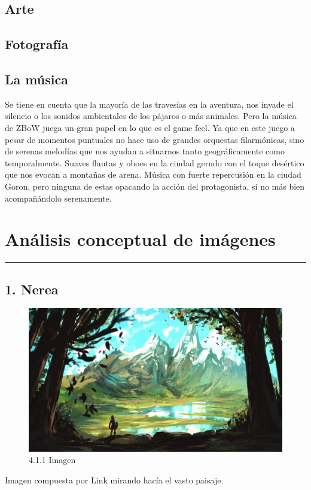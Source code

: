 \documentclass[12pt]{article}
\begin{document}
\subsection{Arte}

\subsection{Fotografía}

\subsection{La música}
Se tiene en cuenta que la mayoría de las travesías en la aventura, nos invade el silencio o los sonidos ambientales de los pájaros o más animales. Pero la música de ZBoW juega un gran papel en lo que es el game feel. Ya que en este juego a pesar de momentos puntuales no hace uso de grandes orquestas filarmónicas, sino de serenas melodías que nos ayudan a situarnos tanto geográficamente como temporalmente. Suaves flautas y oboes en la ciudad gerudo con el toque desértico que nos evocan a montañas de arena. Música con fuerte repercusión en la ciudad Goron, pero ninguna de estas opacando la acción del protagonista, si no más bien acompañándolo serenamente.


\newpage
\section{Análisis conceptual de imágenes}
    \hrule
\vspace{1cm}
    \subsection{1. Nerea}
    \begin{figure}[H]
      \centering
      \includegraphics[scale=0.4]{images/Nerea/1_concept_art.jpg}
      \caption{\small 4.1.1 Imagen}
    \end{figure}
    Imagen compuesta por Link mirando hacía el vasto paisaje.
\end{document}
